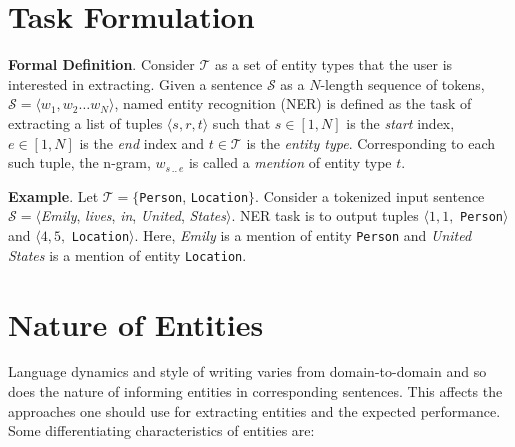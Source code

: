 \section{Task Formulation}
\label{sec:task_formulation}
\textbf{Formal Definition}. Consider $\mathcal{T}$ as a set of entity types that the user is interested in extracting. Given a sentence $\mathcal{S}$ as a $N$-length sequence of tokens, $\mathcal{S} = \langle w_1, w_2 \ldots w_N \rangle$, named entity recognition (NER) is defined as the task of extracting a list of tuples $\langle s, r, t \rangle$ such that $s \in [1, N]$ is the \textit{start} index, $e \in [1, N]$ is the \textit{end} index and $t \in \mathcal{T}$ is the \textit{entity type}. Corresponding to each such tuple, the n-gram, $w_{s\,..\,e}$ is called a \textit{mention} of entity type $t$.

\textbf{Example}. Let $\mathcal{T} = \{$\texttt{Person}, \texttt{Location}$\}$. Consider a tokenized input sentence $\mathcal{S} = \langle$\textit{Emily}, \textit{lives}, \textit{in}, \textit{United}, \textit{States}$\rangle$. NER task is to output tuples $\langle 1, 1,$ \texttt{Person}$\rangle$ and $\langle 4, 5,$ \texttt{Location}$\rangle$. Here, \textit{Emily} is a mention of entity \texttt{Person} and \textit{United States} is a mention of entity \texttt{Location}.

\section{Nature of Entities}
\label{sec:nature_of_entities}
Language dynamics and style of writing varies from domain-to-domain and so does the nature of informing entities in corresponding sentences. This affects the approaches one should use for extracting entities and the expected performance. Some differentiating characteristics of entities are:

